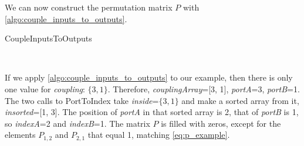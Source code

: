 We can now construct the permutation matrix $P$ with \cref{algo:couple_inputs_to_outputs}.
\begin{algorithm}
    \caption{CoupleInputsToOutputs}
    \label{algo:couple_inputs_to_outputs}
    \begin{algorithmic}
         
         
        \EndFor
        \\ 
        \EndFunction
    \end{algorithmic}
\end{algorithm}

If we apply \cref{algo:couple_inputs_to_outputs} to our example, then there is only one value for \textit{coupling}: $\lbrace 3, 1\rbrace$.
Therefore, \textit{couplingArray}=[3, 1], \textit{portA}=3, \textit{portB}=1.
The two calls to PortToIndex take \textit{inside}=$\lbrace 3, 1\rbrace$ and make a sorted array from it, \textit{insorted}=[1, 3].
The position of \textit{portA} in that sorted array is 2, that of \textit{portB} is 1, so \textit{indexA}=2 and \textit{indexB}=1.
The matrix $P$ is filled with zeros, except for the elements $P_{1, 2}$ and $P_{2, 1}$ that equal 1, matching \cref{eq:p_example}.

